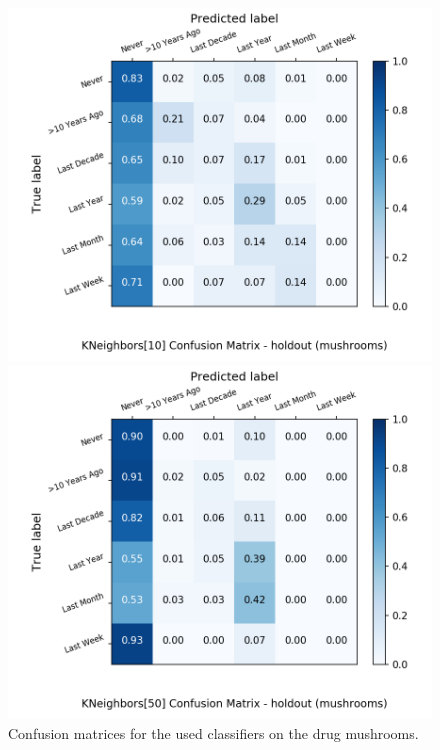 \begin{figure}[H]
\begin{minipage}[b]{0.32\textwidth}
		\includegraphics[width=1.1\textwidth]{Plots/mushrooms_KNeighbors_10_balance_False_holdout.png}
  \end{minipage}
	\begin{minipage}[b]{0.32\textwidth}
		\includegraphics[width=1.1\textwidth]{Plots/mushrooms_KNeighbors_50_balance_False_holdout.png}
  \end{minipage}
	\caption{Confusion matrices for the used classifiers on the drug mushrooms.}
\end{figure}

